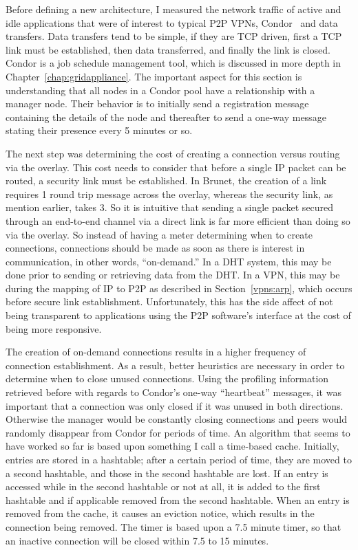 Before defining a new architecture, I measured the network traffic of active
and idle applications that were of interest to typical P2P VPNs,
Condor~\cite{condor0} and data transfers.  Data transfers tend to be simple, if
they are TCP driven, first a TCP link must be established, then data
transferred, and finally the link is closed.  Condor is a job schedule
management tool, which is discussed in more depth in
Chapter~\ref{chap:gridappliance}.  The important aspect for this section is
understanding that all nodes in a Condor pool have a relationship with a
manager node.  Their behavior is to initially send a registration message
containing the details of the node and thereafter to send a one-way message
stating their presence every 5 minutes or so.

The next step was determining the cost of creating a connection versus routing
via the overlay.  This cost needs to consider that before a single IP packet
can be routed, a security link must be established.  In Brunet, the creation of
a link requires 1 round trip message across the overlay, whereas the security
link, as mention earlier, takes 3.  So it is intuitive that sending a single
packet secured through an end-to-end channel via a direct link is far more
efficient than doing so via the overlay.  So instead of having a meter
determining when to create connections, connections should be made as soon as
there is interest in communication, in other words, ``on-demand.''  In a DHT
system, this may be done prior to sending or retrieving data from the DHT.  In
a VPN, this may be during the mapping of IP to P2P as described in
Section~\ref{vpns:arp}, which occurs before secure link establishment.
Unfortunately, this has the side affect of not being transparent to
applications using the P2P software's interface at the cost of being more
responsive.

The creation of on-demand connections results in a higher frequency of
connection establishment.  As a result, better heuristics are necessary in
order to determine when to close unused connections.  Using the profiling
information retrieved before with regards to Condor's one-way ``heartbeat''
messages, it was important that a connection was only closed if it was unused
in both directions.  Otherwise the manager would be constantly closing
connections and peers would randomly disappear from Condor for periods of time.
An algorithm that seems to have worked so far is based upon something I call a
time-based cache.  Initially, entries are stored in a hashtable; after a
certain period of time, they are moved to a second hashtable, and those in the
second hashtable are lost.  If an entry is accessed while in the second
hashtable or not at all, it is added to the first hashtable and if applicable
removed from the second hashtable.  When an entry is removed from the cache, it
causes an eviction notice, which results in the connection being removed.  The
timer is based upon a 7.5 minute timer, so that an inactive connection will be
closed within 7.5 to 15 minutes.

